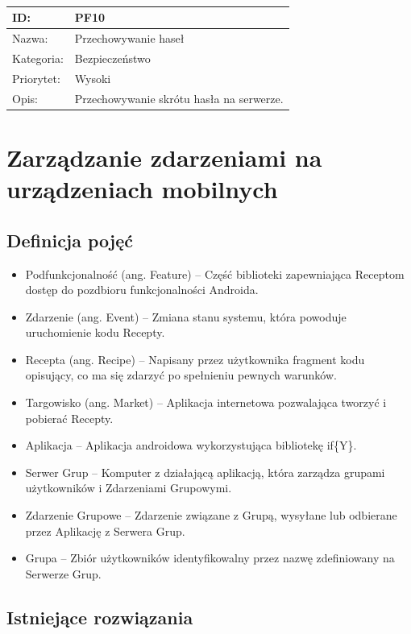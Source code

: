 \documentclass[11pt,a4paper,polish,thesis]{dcsbook}
\begin{document}
\begin{tabular}{|p{2cm}|p{12cm}|}
\\ \hline \end{tabular} \\\\\ \begin{tabular}{|p{2cm}|p{12cm}|}  \hline ID: &
PF10
\\ \hline Nazwa: &
Przechowywanie haseł
\\ \hline Kategoria: &
Bezpieczeństwo
\\ \hline Priorytet: &
Wysoki
\\ \hline Opis: &
Przechowywanie skrótu hasła na serwerze.
\\ \hline \end{tabular}

\chapter{Zarządzanie zdarzeniami na urządzeniach mobilnych}
\section{Definicja pojęć}
\begin{itemize}
\item Podfunkcjonalność (ang. Feature) -- Część biblioteki zapewniająca Receptom dostęp do pozdbioru funkcjonalności Androida.
\item Zdarzenie (ang. Event) -- Zmiana stanu systemu, która powoduje uruchomienie kodu Recepty.
\item Recepta (ang. Recipe) -- Napisany przez użytkownika fragment kodu opisujący, co ma się zdarzyć po spełnieniu pewnych warunków.
\item Targowisko (ang. Market) -- Aplikacja internetowa pozwalająca tworzyć i pobierać Recepty.
\item Aplikacja -- Aplikacja androidowa wykorzystująca bibliotekę if\{Y\}. 
\item Serwer Grup -- Komputer z działającą aplikacją, która zarządza grupami użytkowników i Zdarzeniami Grupowymi.
\item Zdarzenie Grupowe -- Zdarzenie związane z Grupą, wysyłane lub odbierane przez Aplikację z Serwera Grup.
\item Grupa -- Zbiór użytkowników identyfikowalny przez nazwę zdefiniowany na Serwerze Grup.
\end{itemize}
\section{Istniejące rozwiązania}
\end{document}
